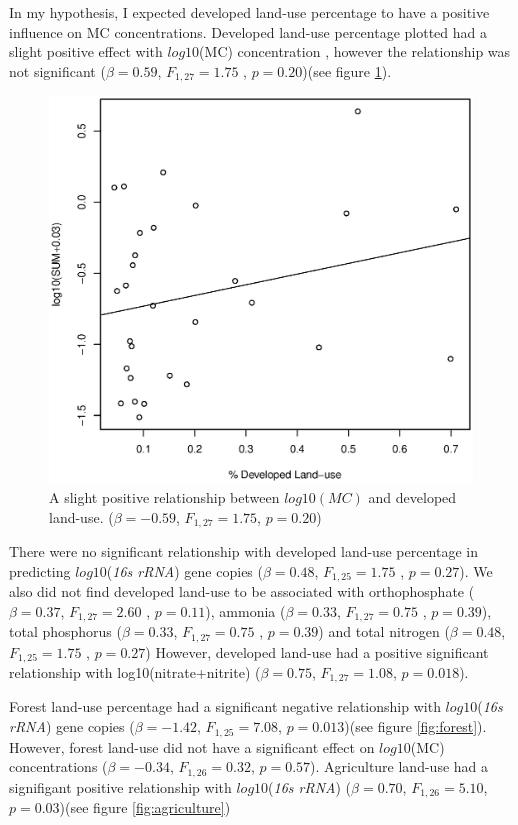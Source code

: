 In my hypothesis, I expected developed land-use percentage to have a positive influence on MC concentrations. Developed land-use percentage plotted had a slight positive effect with $log10$(MC) concentration , however the relationship was not significant  ($\beta=0.59$, $F_{{1,27}}=1.75$ , $p=0.20$)(see figure \ref{fig:developed}).
\begin{figure}[!hp]
	\includegraphics[width=\textwidth]{figures/developed}
	\caption{
A slight positive relationship between $log10(MC)$ and developed land-use. ($\beta=-0.59$, $F_{{1,27}}=1.75$, $p=0.20$)
}
	\label{fig:developed}
\end{figure}
There were no significant relationship with developed land-use percentage in predicting $log10$(\emph{16s rRNA}) gene copies ($\beta=0.48$, $F_{{1,25}}=1.75$ , $p=0.27$). We also did not find developed land-use to be associated with orthophosphate ($\beta=0.37$, $F_{{1,27}}=2.60$ , $p=0.11$), ammonia ($\beta=0.33$, $F_{{1,27}}=0.75$ , $p=0.39$), total phosphorus  ($\beta=0.33$, $F_{{1,27}}=0.75$ , $p=0.39$) and total nitrogen ($\beta=0.48$, $F_{{1,25}}=1.75$ , $p=0.27$) However, developed land-use had a positive significant relationship with log10(nitrate+nitrite) ($\beta=0.75$, $F_{{1,27}}=1.08$, $p=0.018$). 

Forest land-use percentage had a significant negative relationship with $log10$(\emph{16s rRNA}) gene copies ($\beta=-1.42$, $F_{{1,25}}=7.08$, $p=0.013$)(see figure \ref{fig:forest}). However, forest land-use did not have a significant effect on $log10$(MC) concentrations ($\beta=-0.34$, $F_{{1,26}}=0.32$, $p=0.57$). Agriculture land-use had a signifigant positive relationship with $log10$(\emph{16s rRNA}) ($\beta=0.70$, $F_{{1,26}}=5.10$, $p=0.03$)(see figure \ref{fig:agriculture})


